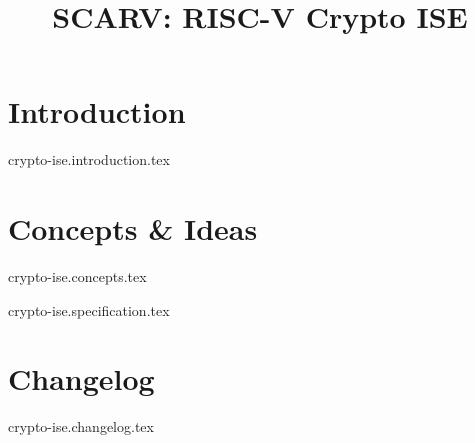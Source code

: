 \documentclass{article}
\title{SCARV: RISC-V Crypto ISE}
\begin{document}
\maketitle
\tableofcontents

\section{Introduction}
{crypto-ise.introduction.tex}

\section{Concepts \& Ideas}
{crypto-ise.concepts.tex}

{crypto-ise.specification.tex}


\printbibliography


\section{Changelog}
{crypto-ise.changelog.tex}
\end{document}
